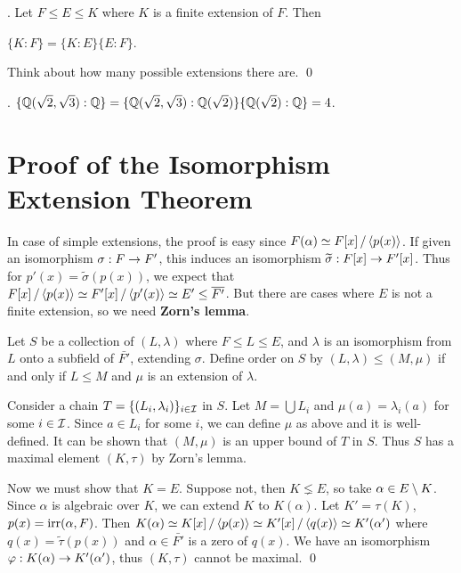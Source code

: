\cor. Let \(F \leq E \leq K\) where \(K\) is a finite extension of \(F\). Then
\begin{center}
    \(\{K : F\} = \{K : E\} \{E : F\}\).
\end{center}
\pf Think about how many possible extensions there are. \qed

\ex. \(\{\mathbb{Q}(\sqrt{2}, \sqrt{3}) : \mathbb{Q}\} = \{\mathbb{Q}(\sqrt{2}, \sqrt{3}) : \mathbb{Q}(\sqrt{2})\} \{\mathbb{Q}(\sqrt{2}) : \mathbb{Q}\} = 4\).

\section*{Proof of the Isomorphism Extension Theorem}

In case of simple extensions, the proof is easy since \(F(\alpha) \simeq F[x] \operatorname{/} \left\langle p(x) \right\rangle\). If given an isomorphism \(\sigma : F \rightarrow F'\), this induces an isomorphism \(\widetilde{\sigma} : F[x] \rightarrow F'[x]\). Thus for \(p'(x) = \tilde{\sigma}(p(x))\), we expect that \(F[x] \quotient \span{p(x)} \simeq F'[x] \quotient \span{p'(x)} \simeq E' \leq \bar{F'}\). But there are cases where \(E\) is not a finite extension, so we need \textbf{Zorn's lemma}.

\pf Let \(S\) be a collection of \((L, \lambda)\) where \(F \leq L \leq E\), and \(\lambda\) is an isomorphism from \(L\) onto a subfield of \(\bar{F'}\), extending \(\sigma\). Define order on \(S\) by \((L, \lambda) \leq (M, \mu)\) if and only if \(L \leq M\) and \(\mu\) is an extension of \(\lambda\).

Consider a chain \(T = \{(L_i, \lambda_i)\}_{i \in \mathcal{I}}\) in \(S\). Let \(M = \bigcup L_i\) and \(\mu(a) = \lambda_i(a)\) for some \(i \in \mathcal{I}\). Since \(a \in L_i\) for some \(i\), we can define \(\mu\) as above and it is well-defined. It can be shown that \((M, \mu)\) is an upper bound of \(T\) in \(S\). Thus \(S\) has a maximal element \((K, \tau)\) by Zorn's lemma.

Now we must show that \(K = E\). Suppose not, then \(K \lneq E\), so take \(\alpha \in E \setminus K\). Since \(\alpha\) is algebraic over \(K\), we can extend \(K\) to \(K(\alpha)\). Let \(K' = \tau(K)\), \(p(x) = \mathrm{irr}(\alpha, F)\). Then \(K(\alpha) \simeq K[x] \operatorname{/} \left\langle p(x) \right\rangle \simeq K'[x] \operatorname{/} \left\langle q(x) \right\rangle \simeq K'(\alpha')\) where \(q(x) = \tilde{\tau}(p(x))\) and \(\alpha \in \bar{F'}\) is a zero of \(q(x)\). We have an isomorphism \(\varphi : K(\alpha) \rightarrow K'(\alpha')\), thus \((K, \tau)\) cannot be maximal. \qed

\pagebreak


